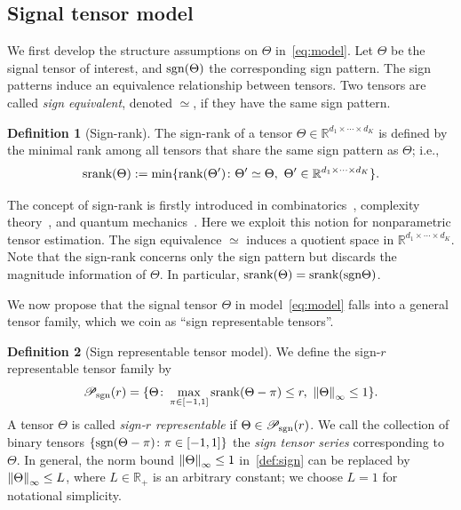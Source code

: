 \documentclass[twoside,11pt]{article}
\theoremstyle{definition}
\newtheorem{defn}{Definition}
\def\sign{\textup{sgn}}
\def\srank{\textup{srank}}
\def\rank{\textup{rank}}
\def\caliP{\mathscr{P}_{\textup{sgn}}}
\begin{document}
\subsection{Signal tensor model}
We first develop the structure assumptions on $\Theta$ in~\eqref{eq:model}. Let $\Theta$ be the signal tensor of interest, and $\sign (\Theta)$ the corresponding sign pattern. The sign patterns induce an equivalence relationship between tensors. Two tensors are called \emph{sign equivalent}, denoted $\simeq$, if they have the same sign pattern. 
\begin{defn}[Sign-rank]
The sign-rank of a tensor $\Theta\in\mathbb{R}^{d_1\times \cdots \times d_K}$ is defined by the minimal rank among all tensors that share the same sign pattern as $\Theta$; i.e.,
\begin{equation}\label{eq:sign-rank}
\srank(\Theta) := \min \{\rank(\Theta')\colon  \Theta'\simeq \Theta,\ \Theta'\in\mathbb{R}^{d_1\times \cdots \times d_K}\}.
\end{equation}
\end{defn}
The concept of sign-rank is firstly introduced in combinatorics~\citep{cohn2013fast}, complexity theory~\citep{alon2016sign}, and quantum mechanics~\citep{de2003nondeterministic}. Here we exploit this notion for nonparametric tensor estimation. The sign equivalence $\simeq$ induces a quotient space in $\mathbb{R}^{d_1\times \cdots \times d_K}$. Note that the sign-rank concerns only the sign pattern but discards the magnitude information of $\Theta$. In particular, $\srank(\Theta)=\srank(\sign \Theta)$. 

We now propose that the signal tensor $\Theta$ in model~\eqref{eq:model} falls into a general tensor family, which we coin as ``sign representable tensors''.
\begin{defn}[Sign representable tensor model] 
We define the sign-$r$ representable tensor family by 
\begin{equation}\label{def:sign}
\caliP(r)=\{\Theta\colon \max_{\pi\in[-1,1]}\srank(\Theta-\pi)\leq r,\ \mnorm{\Theta}\leq 1\}.
\end{equation}
A tensor $\Theta$ is called \emph{sign-$r$ representable} if $\Theta\in \caliP(r)$. We call the collection of binary tensors $\{\sign(\Theta-\pi)\colon \pi \in[-1,1]\}$ the \emph{sign tensor series} corresponding to $\Theta$. In general, the norm bound $\left\lVert\Theta\right\rVert_\infty\leq 1$ in~\eqref{def:sign} can be replaced by $\left\lVert\Theta\right\rVert_\infty\leq L$, where $L \in\mathbb{R}_{+}$ is an arbitrary constant; we choose $L=1$ for notational simplicity. 
\end{defn}
\end{document}
